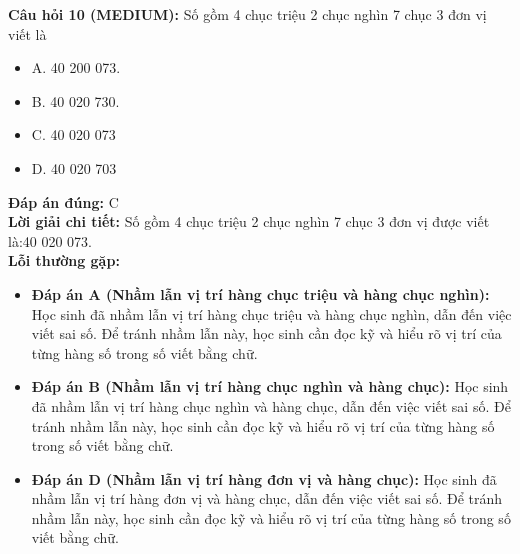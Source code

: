 \documentclass{article}
\begin{document}
\begin{minipage}{\textwidth}
\noindent\textbf{Câu hỏi 10 (MEDIUM):} Số gồm 4 chục triệu 2 chục nghìn 7 chục 3 đơn vị viết là 
\begin{itemize}[label={}]
    \item A. 40 200 073.
    \item B. 40 020 730.
    \item C. 40 020 073
    \item D. 40 020 703
\end{itemize}
\textbf{Đáp án đúng:} C \\
\textbf{Lời giải chi tiết:} Số gồm 4 chục triệu 2 chục nghìn 7 chục 3 đơn vị được viết là:40 020 073. \\
\textbf{Lỗi thường gặp:}
\begin{itemize}
  \item \textbf{Đáp án A (Nhầm lẫn vị trí hàng chục triệu và hàng chục nghìn):} Học sinh đã nhầm lẫn vị trí hàng chục triệu và hàng chục nghìn, dẫn đến việc viết sai số. Để tránh nhầm lẫn này, học sinh cần đọc kỹ và hiểu rõ vị trí của từng hàng số trong số viết bằng chữ.
  \item \textbf{Đáp án B (Nhầm lẫn vị trí hàng chục nghìn và hàng chục):} Học sinh đã nhầm lẫn vị trí hàng chục nghìn và hàng chục, dẫn đến việc viết sai số. Để tránh nhầm lẫn này, học sinh cần đọc kỹ và hiểu rõ vị trí của từng hàng số trong số viết bằng chữ.
  \item \textbf{Đáp án D (Nhầm lẫn vị trí hàng đơn vị và hàng chục):} Học sinh đã nhầm lẫn vị trí hàng đơn vị và hàng chục, dẫn đến việc viết sai số. Để tránh nhầm lẫn này, học sinh cần đọc kỹ và hiểu rõ vị trí của từng hàng số trong số viết bằng chữ.
\end{itemize}
\end{minipage}
\vspace{1em}
\end{document}
